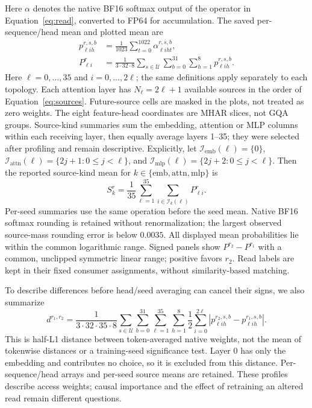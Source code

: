 \documentclass[11pt,letterpaper]{article}
\begin{document}
Here $\alpha$ denotes the native BF16 softmax output of the operator in
Equation~\ref{eq:read}, converted to FP64 for accumulation. The saved
per-sequence/head mean and plotted mean are
\begin{align}
 p^{r,s,b}_{\ell ih}
  &=\frac{1}{1023}\sum_{t=0}^{1022}\alpha^{r,s,b}_{\ell iht},\\
 P^r_{\ell i}
  &=\frac{1}{3\cdot32\cdot8}\sum_{s\in\mathcal U}\sum_{b=0}^{31}\sum_{h=1}^{8}
       p^{r,s,b}_{\ell ih}.
 \label{eq:profile-mean}
\end{align}
Here $\ell=0,\ldots,35$ and $i=0,\ldots,2\ell$; the same definitions
apply separately to each topology. Each attention layer has $N_\ell=2\ell+1$
available sources in the order of Equation~\ref{eq:sources}.
Future-source cells are masked in the plots, not treated as zero
weights. The eight feature-head coordinates are MHAR slices, not GQA groups.
Source-kind summaries sum the embedding, attention or MLP columns within
each receiving layer, then equally average layers 1--35; they were selected
after profiling and remain descriptive. Explicitly, let
$\mathcal I_{\mathrm{emb}}(\ell)=\{0\}$,
$\mathcal I_{\mathrm{attn}}(\ell)=\{2j+1:0\leq j<\ell\}$, and
$\mathcal I_{\mathrm{mlp}}(\ell)=\{2j+2:0\leq j<\ell\}$. Then the reported
source-kind mean for $k\in\{\mathrm{emb},\mathrm{attn},\mathrm{mlp}\}$ is
\begin{equation}
 S_k^r=\frac{1}{35}\sum_{\ell=1}^{35}
                  \sum_{i\in\mathcal I_k(\ell)}P^r_{\ell i}.
 \label{eq:profile-source-kind}
\end{equation}
Per-seed summaries use the same operation before the seed mean.
Native BF16 softmax rounding is retained without renormalization; the largest
observed source-mass rounding error is below $0.0035$. All displayed mean
probabilities lie within the common logarithmic range. Signed panels show
$P^{r_2}-P^{r_1}$ with a common, unclipped symmetric linear range; positive
favors $r_2$. Read labels are
kept in their fixed consumer assignments, without similarity-based matching.

To describe differences before head/seed averaging can cancel their signs,
we also summarize
\begin{equation}
 d^{r_1,r_2}=\frac{1}{3\cdot32\cdot35\cdot8}
 \sum_{s\in\mathcal U}\sum_{b=0}^{31}\sum_{\ell=1}^{35}\sum_{h=1}^{8}
 \frac12\sum_{i=0}^{2\ell}
  \left|p^{r_2,s,b}_{\ell ih}-p^{r_1,s,b}_{\ell ih}\right|.
 \label{eq:profile-distance}
\end{equation}
This is half-L1 distance between token-averaged native weights, not the
mean of tokenwise distances or a training-seed significance test. Layer 0
has only the embedding and contributes no choice, so it is excluded from
this distance. Per-sequence/head arrays and per-seed source means are
retained. These profiles describe access weights; causal importance and
the effect of retraining an altered read remain different questions.
\end{document}
